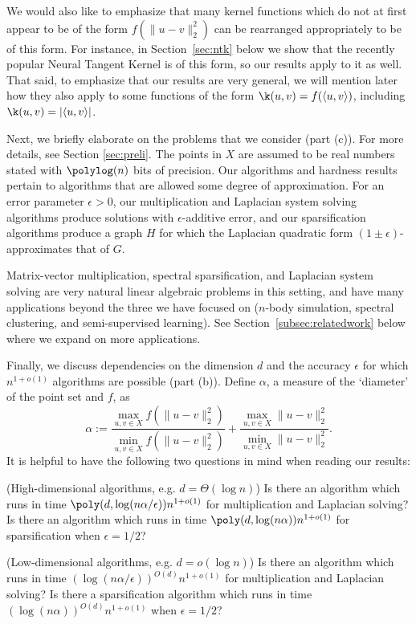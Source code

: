 We would also like to emphasize that many kernel functions which do not
at first appear to be of the form $f(\|u-v\|_2^2)$ can be rearranged
appropriately to be of this form. For instance, in Section~\ref{sec:ntk} below we show that the
recently popular Neural Tangent Kernel is of this form, so our results
apply to it as well.  That said, to emphasize that our results are very
general, we will mention later how they also apply to some functions of
the form $\k(u,v) = f(\langle u,v\rangle )$, including $\k(u,v) =
|\langle u,v\rangle |$.

Next, we briefly elaborate on the problems that we consider (part (c)).
For more details, see Section
\ref{sec:preli}.  The points in $X$ are assumed to be real numbers
stated with $\polylog(n)$ bits of precision. Our algorithms and hardness
results pertain to algorithms that are allowed some degree of
approximation. For an error parameter $\epsilon > 0$, our multiplication
and Laplacian system solving algorithms produce solutions with
$\epsilon$-additive error, and our sparsification algorithms produce a
graph $H$ for which the Laplacian quadratic form $(1 \pm
    \epsilon)$-approximates that of $G$.

Matrix-vector multiplication, spectral sparsification, and Laplacian
system solving are very natural linear algebraic problems in this
setting, and have many applications beyond the three we have focused on
($n$-body simulation, spectral clustering, and semi-supervised
 learning). See Section~\ref{subsec:relatedwork} below where we expand
on more applications.

Finally, we discuss dependencies on the dimension $d$ and the accuracy
$\epsilon$ for which $n^{1+o(1)}$ algorithms are possible (part (b)).
Define $\alpha$, a measure of the `diameter' of the point set and $f$,
       as $$\alpha := \frac{ \max_{u,v \in X} f( \| u - v \|_2^2 ) }{
         \min_{u,v \in X} f( \| u - v \|_2^2 ) } + \frac{ \max_{u,v \in
           X}  \| u - v \|_2^2  }{ \min_{u,v \in X}  \| u - v \|_2^2
           }.$$ It is helpful to have the following two questions in
mind when reading our results:

\vspace{2mm} \begin{tight_itemize} \item (High-dimensional algorithms,
    e.g. $d = \Theta(\log n)$) Is there an algorithm which runs in time
$\poly(d, \log(n\alpha/\epsilon)) n^{1+o(1)}$ for multiplication and
Laplacian solving? Is there an algorithm which runs in time $\poly(d,
    \log(n\alpha))n^{1+o(1)}$ for sparsification when $\epsilon=1/2$?

\item (Low-dimensional algorithms, e.g. $d = o(\log n)$) Is there an
algorithm which runs in time $(\log(n\alpha/\epsilon))^{O(d)}
n^{1+o(1)}$ for multiplication and Laplacian solving? Is there a
sparsification algorithm which runs in time $(\log(n\alpha))^{O(d)}
n^{1+o(1)}$ when $\epsilon=1/2$?  \end{tight_itemize} \vspace{2mm}

